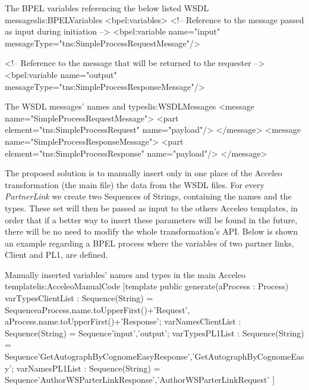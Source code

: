 \begin{center}
  \begin{minipage}{1\textwidth}
    \begin{workflow-code}{The BPEL variables referencing the below listed WSDL messages}{lis:BPELVariables}
<bpel:variables>
     <!-- Reference to the message passed as input during initiation -->
        <bpel:variable name="input"
                  messageType="tns:SimpleProcessRequestMessage"/>
                  
     <!-- Reference to the message that will be returned to the requester -->
        <bpel:variable name="output"
                  messageType="tns:SimpleProcessResponseMessage"/>
    \end{workflow-code}
  \end{minipage}
  \hfill
\begin{minipage}{1\textwidth}
    \begin{workflow-code}{The WSDL messages' names and types}{lis:WSDLMessages}
    <message name="SimpleProcessRequestMessage">
        <part element="tns:SimpleProcessRequest" name="payload"/>
    </message>
    <message name="SimpleProcessResponseMessage">
        <part element="tns:SimpleProcessResponse" name="payload"/>
    </message>	
    \end{workflow-code}
  \end{minipage}
\end{center}

The proposed solution is to manually insert only in one place of the Acceleo transformation (the main file) the data from the WSDL files. For every \textit{PartnerLink} we create two Sequences of Strings, containing the names and the types. These set will then be passed as input to the others Acceleo templates, in order that if a better way to insert these parameters will be found in the future, there will be no need to modify the whole transformation's API. Below is shown an example regarding a BPEL process where the variables of two partner links, Client and PL1, are defined.

\begin{center}
  \begin{minipage}{1\textwidth}
    \begin{java-code}{Manually inserted variables' names and types in the main Acceleo template}{lis:AcceleoManualCode}
[template public generate(aProcess : Process) {	
	varTypesClientList : Sequence(String) = Sequence{aProcess.name.toUpperFirst()+'Request', aProcess.name.toUpperFirst()+'Response'};
	varNamesClientList : Sequence(String) = Sequence{'input','output'};
	varTypesPL1List : Sequence(String) = Sequence{'GetAutographByCognomeEasyResponse','GetAutographByCognomeEasy'};
	varNamesPL1List : Sequence(String) = Sequence{'AuthorWSParterLinkResponse','AuthorWSParterLinkRequest'}
	}]	
    \end{java-code}
  \end{minipage}
\end{center}

